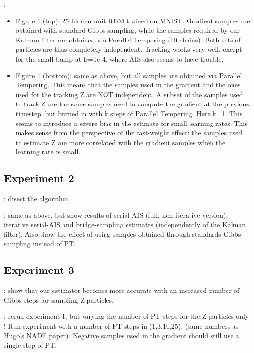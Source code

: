 \documentclass[runningheads,a4paper]{llncs}
\begin{document}
\bigskip
{}:
\begin{itemize}
    \item Figure 1 (top): 25 hidden unit RBM trained on MNIST.  Gradient samples are obtained with standard Gibbs sampling, while the samples required by our Kalman filter are obtained via Parallel Tempering (10 chains). Both sets of particles are thus completely independent. Tracking works very well, except for the small bump at lr=1e-4, where AIS also seems to have trouble.
    \item Figure 1 (bottom): same as above, but all samples are obtained via Parallel Tempering. This means that the samples used in the gradient and the ones used for the tracking Z are NOT independent. A subset of the samples used to track Z are the same samples used to compute the gradient at the previous timestep, but burned in with k steps of Parallel Tempering. Here k=1. This seems to introduce a severe bias in the estimate for small learning rates. This makes sense from the perspective of the fast-weight effect: the samples used to estimate Z are more correlated with the gradient samples when the learning rate is small.
\end{itemize}

\clearpage

\subsection{Experiment 2}

: disect the algorithm.

: same as above, but show results of serial AIS
(full, non-iterative version), iterative serial-AIS and bridge-sampling
estimates (independently of the Kalman filter). Also show the effect of using
samples obtained through standards Gibbs sampling instead of PT.


\newpage
\subsection{Experiment 3}

: show that our estimator becomes more accurate with an increased
number of Gibbs steps for sampling Z-particles.

: rerun experiment 1, but varying the number of PT steps for the
Z-particles only ! Run experiment with a number of PT steps in
(1,3,10,25). (same numbers as Hugo's NADE paper). Negative samples used in the
gradient should still use a single-step of PT. 
\end{document}
